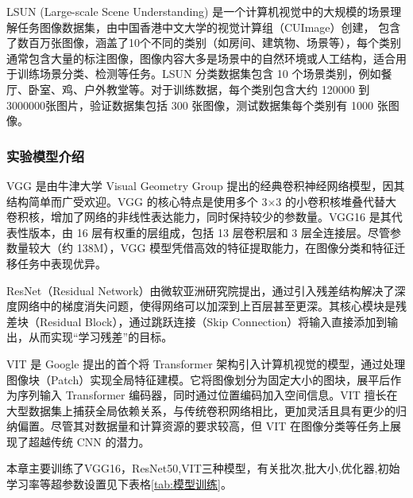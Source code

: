 LSUN (Large-scale Scene Understanding) 是一个计算机视觉中的大规模的场景理解任务图像数据集，由中国香港中文大学的视觉计算组（CUImage）创建， 包含了数百万张图像，涵盖了10个不同的类别（如房间、建筑物、场景等），每个类别通常包含大量的标注图像，图像内容大多是场景中的自然环境或人工结构，适合用于训练场景分类、检测等任务。LSUN 分类数据集包含 10 个场景类别，例如餐厅、卧室、鸡、户外教堂等。对于训练数据，每个类别包含大约 120000 到 3000000张图片，验证数据集包括 300 张图像，测试数据集每个类别有 1000 张图像。


\subsubsection{实验模型介绍}
VGG 是由牛津大学 Visual Geometry Group 提出的经典卷积神经网络模型，因其结构简单而广受欢迎。VGG 的核心特点是使用多个 3×3 的小卷积核堆叠代替大卷积核，增加了网络的非线性表达能力，同时保持较少的参数量。VGG16 是其代表性版本，由 16 层有权重的层组成，包括 13 层卷积层和 3 层全连接层。尽管参数量较大（约 138M），VGG 模型凭借高效的特征提取能力，在图像分类和特征迁移任务中表现优异。

ResNet（Residual Network）由微软亚洲研究院提出，通过引入残差结构解决了深度网络中的梯度消失问题，使得网络可以加深到上百层甚至更深。其核心模块是残差块（Residual Block），通过跳跃连接（Skip Connection）将输入直接添加到输出，从而实现“学习残差”的目标。

VIT 是 Google 提出的首个将 Transformer 架构引入计算机视觉的模型，通过处理图像块（Patch）实现全局特征建模。它将图像划分为固定大小的图块，展平后作为序列输入 Transformer 编码器，同时通过位置编码加入空间信息。VIT 擅长在大型数据集上捕获全局依赖关系，与传统卷积网络相比，更加灵活且具有更少的归纳偏置。尽管其对数据量和计算资源的要求较高，但 VIT 在图像分类等任务上展现了超越传统 CNN 的潜力。

本章主要训练了VGG16，ResNet50,VIT三种模型，有关批次,批大小,优化器,初始学习率等超参数设置见下表格\ref{tab:模型训练}。
\begin{table}[htbp]
	\captionsetup{font=small, justification=centering}
	\centering
	\caption{
	模型训练超参数设置
	}
        \label{tab:模型训练}
\end{table}



